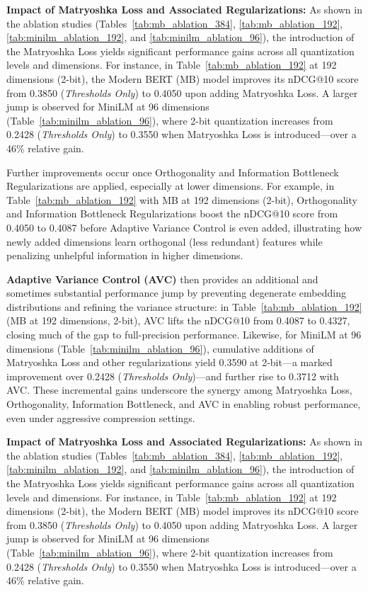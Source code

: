 \textbf{Impact of Matryoshka Loss and Associated Regularizations:}
As shown in the ablation studies (Tables~\ref{tab:mb_ablation_384}, \ref{tab:mb_ablation_192}, \ref{tab:minilm_ablation_192}, and \ref{tab:minilm_ablation_96}), the introduction of the Matryoshka Loss yields significant performance gains across all quantization levels and dimensions. 
For instance, in Table~\ref{tab:mb_ablation_192} at 192 dimensions (2-bit), the Modern BERT (MB) model improves its nDCG@10 score from 0.3850 (\textit{Thresholds Only}) to 0.4050 upon adding Matryoshka Loss. 
A larger jump is observed for MiniLM at 96 dimensions (Table~\ref{tab:minilm_ablation_96}), where 2-bit quantization increases from 0.2428 (\textit{Thresholds Only}) to 0.3550 when Matryoshka Loss is introduced—over a 46\% relative gain.

Further improvements occur once Orthogonality and Information Bottleneck Regularizations are applied, especially at lower dimensions. 
For example, in Table~\ref{tab:mb_ablation_192} with MB at 192 dimensions (2-bit), Orthogonality and Information Bottleneck Regularizations boost the nDCG@10 score from 0.4050 to 0.4087 before Adaptive Variance Control is even added, illustrating how newly added dimensions learn orthogonal (less redundant) features while penalizing unhelpful information in higher dimensions.

\textbf{Adaptive Variance Control (AVC)} then provides an additional and sometimes substantial performance jump by preventing degenerate embedding distributions and refining the variance structure: 
in Table~\ref{tab:mb_ablation_192} (MB at 192 dimensions, 2-bit), AVC lifts the nDCG@10 from 0.4087 to 0.4327, closing much of the gap to full-precision performance. 
Likewise, for MiniLM at 96 dimensions (Table~\ref{tab:minilm_ablation_96}), cumulative additions of Matryoshka Loss and other regularizations yield 0.3590 at 2-bit—a marked improvement over 0.2428 (\textit{Thresholds Only})—and further rise to 0.3712 with AVC. 
These incremental gains underscore the synergy among Matryoshka Loss, Orthogonality, Information Bottleneck, and AVC in enabling robust performance, even under aggressive compression settings.


\textbf{Impact of Matryoshka Loss and Associated Regularizations:}
As shown in the ablation studies (Tables~\ref{tab:mb_ablation_384}, \ref{tab:mb_ablation_192}, \ref{tab:minilm_ablation_192}, and \ref{tab:minilm_ablation_96}), the introduction of the Matryoshka Loss yields significant performance gains across all quantization levels and dimensions. 
For instance, in Table~\ref{tab:mb_ablation_192} at 192 dimensions (2-bit), the Modern BERT (MB) model improves its nDCG@10 score from 0.3850 (\textit{Thresholds Only}) to 0.4050 upon adding Matryoshka Loss. 
A larger jump is observed for MiniLM at 96 dimensions (Table~\ref{tab:minilm_ablation_96}), where 2-bit quantization increases from 0.2428 (\textit{Thresholds Only}) to 0.3550 when Matryoshka Loss is introduced—over a 46\% relative gain.

